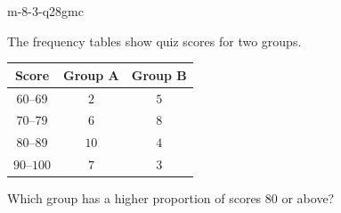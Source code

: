 \begin{practiceQuestion}{m-8-3-q28}{gmc}
\begin{questionText}
The frequency tables show quiz scores for two groups.

\begin{center}
\begin{tabular}{|c|c|c|}
\hline
\textbf{Score} & \textbf{Group A} & \textbf{Group B} \\
\hline
$60$--$69$ & $2$ & $5$ \\
\hline
$70$--$79$ & $6$ & $8$ \\
\hline
$80$--$89$ & $10$ & $4$ \\
\hline
$90$--$100$ & $7$ & $3$ \\
\hline
\end{tabular}
\end{center}

Which group has a higher proportion of scores $80$ or above?
\end{questionText}
\end{practiceQuestion}

